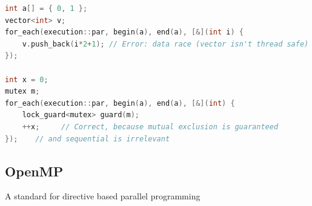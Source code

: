 \begin{lstlisting}[language=C++]
int a[] = { 0, 1 };
vector<int> v;
for_each(execution::par, begin(a), end(a), [&](int i) {
    v.push_back(i*2+1); // Error: data race (vector isn't thread safe)
});

int x = 0;
mutex m;
for_each(execution::par, begin(a), end(a), [&](int) {
    lock_guard<mutex> guard(m);
    ++x;     // Correct, because mutual exclusion is guaranteed
});    // and sequential is irrelevant
\end{lstlisting}

\hypertarget{openmp}{%
\subsection{OpenMP}\label{openmp}}

A standard for directive based parallel programming

